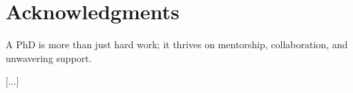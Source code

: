 \chapter*{Acknowledgments}
A PhD is more than just hard work; it thrives on mentorship, collaboration, and unwavering support.

[...]